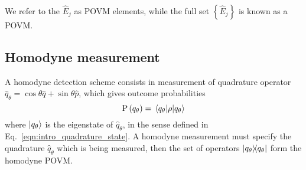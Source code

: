 \noindent We refer to the $\hat{E}_j$ as POVM elements, while the full set $\left\{\hat{E}_j\right\}$ is known as a POVM.



\FloatBarrier
\subsection{Homodyne measurement}\label{sec:intro_homodyne}
A homodyne detection scheme consists in measurement of quadrature operator $\hat{q}_\theta = \cos\theta \hat{q} + \sin\theta \hat{p}$, which gives outcome probabilities
\begin{equation}
\text{P}\left(q_\theta\right) = \ev{\rho}{q_\theta}
\end{equation}
where $\ket{q_\theta}$ is the eigenstate of $\hat{q}_\theta$, in the sense defined in Eq.~\ref{eqn:intro_quadrature_state}. A homodyne measurement must specify the quadrature $\hat{q}_\theta$ which is being measured, then the set of operators $\dyad{q_\theta}$ form the homodyne POVM.


